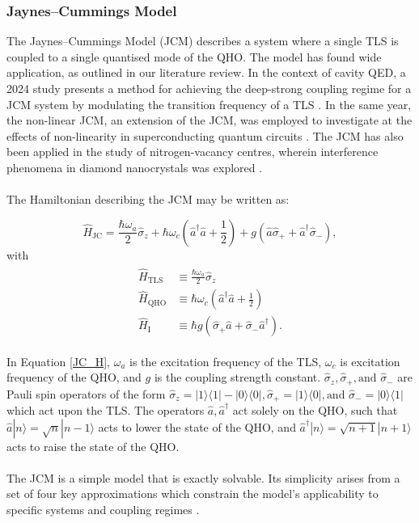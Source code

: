 \documentclass[11pt]{article}
\begin{document}
\subsubsection{Jaynes--Cummings Model} \label{sec:theory_subsub_JCM}

The Jaynes--Cummings Model (JCM) describes a system where a single TLS is coupled to a single quantised mode of the QHO. The model has found wide application, as outlined in our literature review. In the context of cavity QED, a 2024 study presents a method for achieving the deep-strong coupling regime for a JCM system by modulating the transition frequency of a TLS \cite{Context2024-CQED_JCM}. In the same year, the non-linear JCM, an extension of the JCM, was employed to investigate at the effects of non-linearity in superconducting quantum circuits \cite{Context2024-CircuitQED}. The JCM has also been applied in the study of nitrogen-vacancy centres, wherein interference phenomena in diamond nanocrystals was explored \cite{Context2009-Alt_NVcentres}. \\
\\
The Hamiltonian describing the JCM may be written as:

\begin{equation} \label{JC_H}
    \hat{H}_{\scriptscriptstyle \text{JC}} = \frac{\hbar\omega_a}{2}\hat{\sigma}_z + \hbar\omega_c\left(\hat{a}^\dagger \hat{a} + \frac{1}{2} \right) + g(\hat{a}\hat{\sigma}_{+} + \hat{a}^\dagger\hat{\sigma}_{-}), 
\end{equation} 
with 
\begin{align*}
    \begin{aligned}
        \hat{H}_{\scriptscriptstyle \text{TLS}} &\equiv \frac{\hbar\omega_a}{2}\hat{\sigma}_z \\
        \hat{H}_{\scriptscriptstyle \text{QHO}} &\equiv \hbar\omega_c\left(\hat{a}^\dagger \hat{a} + \frac{1}{2} \right) \\
        \hat{H}_{\scriptscriptstyle \text{I}} &\equiv \hbar g(\hat{\sigma}_{+}\hat{a} +\hat{\sigma}_{-}\hat{a}^\dagger).
    \end{aligned}
\end{align*}

In Equation \eqref{JC_H}, $\omega_a$ is the excitation frequency of the TLS, $\omega_c$ is excitation frequency of the QHO, and $g$ is the coupling strength constant. $\hat{\sigma}_z, \hat{\sigma}_+, \text{and } \hat{\sigma}_-$ are Pauli spin operators of the form $\hat{\sigma}_z = |1\rangle\langle1| - |0\rangle\langle0|, \hat{\sigma}_+ = |1\rangle\langle0|, \text{and } \hat{\sigma}_- = |0\rangle\langle1|$ which act upon the TLS. The operators $\hat{a}, \hat{a}^\dagger$ act solely on the QHO, such that $\hat{a}|n\rangle = \sqrt{n}|n-1\rangle$ acts to lower the state of the QHO, and $\hat{a}^{\dagger}|n\rangle = \sqrt{n+1}|n+1\rangle$ acts to raise the state of the QHO.\\
\\
The JCM is a simple model that is exactly solvable. Its simplicity arises from a set of four key approximations which constrain the model’s applicability to specific systems and coupling regimes \cite{General2024-JC_overview}. 
\end{document}
